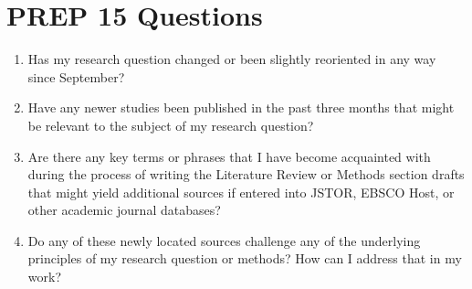 
\section[PREP 15 Questions]{PREP 15 Questions}


\begin{enumerate}
  \item Has my research question changed or been slightly reoriented in any way since September?
  \item Have any newer studies been published in the past three months that might be relevant to the subject of my research question?
  \item Are there any key terms or phrases that I have become acquainted with during the process of writing the Literature Review or Methods section drafts that might yield additional sources if entered into JSTOR, EBSCO Host, or other academic journal databases?
  \item Do any of these newly located sources challenge any of the underlying principles of my research question or methods? How can I address that in my work?
\end{enumerate}

